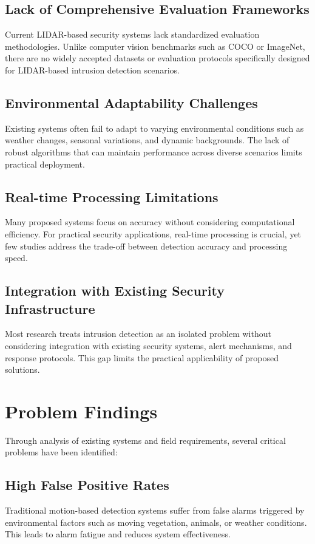 \documentclass[conference]{IEEEtran}
\begin{document}
\subsection{Lack of Comprehensive Evaluation Frameworks}
Current LIDAR-based security systems lack standardized evaluation methodologies. Unlike computer vision benchmarks such as COCO or ImageNet, there are no widely accepted datasets or evaluation protocols specifically designed for LIDAR-based intrusion detection scenarios.

\subsection{Environmental Adaptability Challenges}
Existing systems often fail to adapt to varying environmental conditions such as weather changes, seasonal variations, and dynamic backgrounds. The lack of robust algorithms that can maintain performance across diverse scenarios limits practical deployment.

\subsection{Real-time Processing Limitations}
Many proposed systems focus on accuracy without considering computational efficiency. For practical security applications, real-time processing is crucial, yet few studies address the trade-off between detection accuracy and processing speed.

\subsection{Integration with Existing Security Infrastructure}
Most research treats intrusion detection as an isolated problem without considering integration with existing security systems, alert mechanisms, and response protocols. This gap limits the practical applicability of proposed solutions.

\section{Problem Findings}
Through analysis of existing systems and field requirements, several critical problems have been identified:

\subsection{High False Positive Rates}
Traditional motion-based detection systems suffer from false alarms triggered by environmental factors such as moving vegetation, animals, or weather conditions. This leads to alarm fatigue and reduces system effectiveness.
\end{document}
